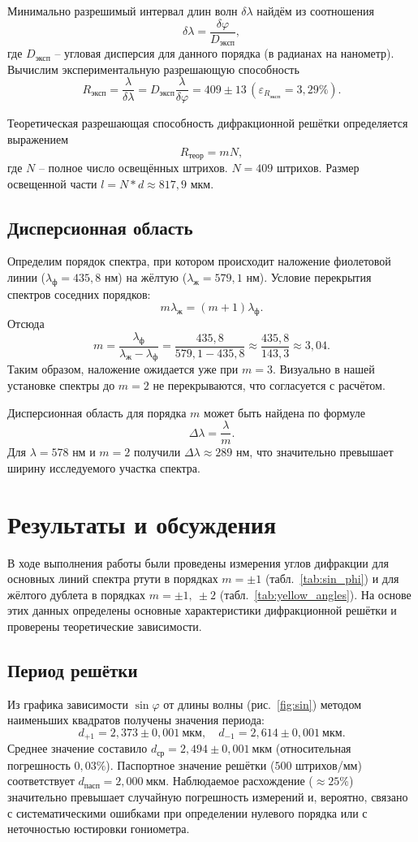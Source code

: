 \documentclass[a4paper]{article}
\begin{document}
Минимально разрешимый интервал длин волн $\delta\lambda$ найдём из соотношения
\[
\delta\lambda = \frac{\delta\varphi}{D_\text{эксп}},
\]
где $D_\text{эксп}$ – угловая дисперсия для данного порядка (в радианах на нанометр). Вычислим экспериментальную разрешающую способность
\[
R_\text{эксп} = \frac{\lambda}{\delta\lambda} = D_\text{эксп} \frac{\lambda}{\delta\varphi} = 409 \pm 13 \, (\varepsilon_{R_\text{эксп}} = 3,29 \%).
\]

Теоретическая разрешающая способность дифракционной решётки определяется выражением
\[
R_\text{теор} = mN,
\]
где $N$ – полное число освещённых штрихов. $N = 409$ штрихов.
Размер освещенной части $l = N * d \approx 817,9$ мкм.

\subsection{Дисперсионная область}

Определим порядок спектра, при котором происходит наложение фиолетовой линии ($\lambda_\text{ф} = 435,8$ нм) на жёлтую ($\lambda_\text{ж} = 579,1$ нм). Условие перекрытия спектров соседних порядков:
\[
m\lambda_\text{ж} = (m+1)\lambda_\text{ф}.
\]
Отсюда
\[
m = \frac{\lambda_\text{ф}}{\lambda_\text{ж} - \lambda_\text{ф}} = \frac{435,8}{579,1 - 435,8} \approx \frac{435,8}{143,3} \approx 3,04.
\]
Таким образом, наложение ожидается уже при $m = 3$. Визуально в нашей установке спектры до $m = 2$ не перекрываются, что согласуется с расчётом.

Дисперсионная область для порядка $m$ может быть найдена по формуле
\[
\Delta\lambda = \frac{\lambda}{m}.
\]
Для $\lambda = 578$ нм и $m = 2$ получили $\Delta\lambda \approx 289$ нм, что значительно превышает ширину исследуемого участка спектра.

\section{Результаты и обсуждения}

В ходе выполнения работы были проведены измерения углов дифракции для основных линий спектра ртути в порядках $m = \pm1$ (табл.~\ref{tab:sin_phi}) и для жёлтого дублета в порядках $m = \pm1,\ \pm2$ (табл.~\ref{tab:yellow_angles}). На основе этих данных определены основные характеристики дифракционной решётки и проверены теоретические зависимости.

\subsection{Период решётки}
Из графика зависимости $\sin\varphi$ от длины волны (рис.~\ref{fig:sin}) методом наименьших квадратов получены значения периода:
\[
d_{+1} = 2{,}373 \pm 0{,}001\ \text{мкм},\quad d_{-1} = 2{,}614 \pm 0{,}001\ \text{мкм}.
\]
Среднее значение составило $d_\text{ср} = 2{,}494 \pm 0{,}001\ \text{мкм}$ (относительная погрешность $0{,}03\%$). Паспортное значение решётки ($500$ штрихов/мм) соответствует $d_\text{пасп} = 2{,}000\ \text{мкм}$. Наблюдаемое расхождение ($\approx 25\%$) значительно превышает случайную погрешность измерений и, вероятно, связано с систематическими ошибками при определении нулевого порядка или с неточностью юстировки гониометра.
\end{document}
